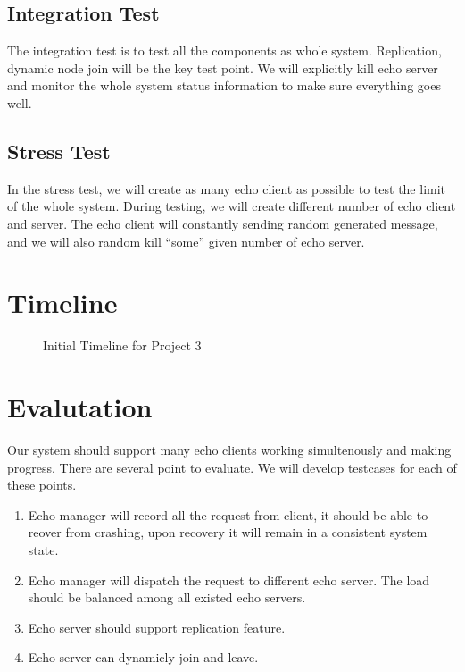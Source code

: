\documentclass[12pt]{article}
\begin{document}
\subsection{Integration Test}
The integration test is to test all the components as whole system. Replication,
dynamic node join will be the key test point. We will explicitly kill echo server
and monitor the whole system status information to make sure everything goes well.

\subsection{Stress Test}
In the stress test, we will create as many echo client as possible to test
the limit of the whole system. During testing, we will create different number 
of echo client and server. The echo client will constantly sending random 
generated message, and we will also random kill ``some'' given number of echo
server.

\section{Timeline}
\begin{figure}[H]
\caption{Initial Timeline for Project 3}
\label{fig:speciation}
\end{figure}

\section{Evalutation}
Our system should support many echo clients working simultenously and   
making progress. There are several point to evaluate. We will develop testcases
for each of these points.
\begin{enumerate}
  \item Echo manager will record all the request from client, it 
    should be able to reover from crashing, upon recovery
    it will remain in a consistent system state. 
  \item Echo manager will dispatch the request to different echo server. The 
    load should be balanced among all existed echo servers.
  \item Echo server should support replication feature. 
  \item Echo server can dynamicly join and leave.
\end{enumerate}
\end{document}
